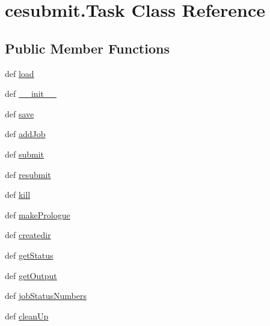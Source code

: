 \section{cesubmit.\-Task Class Reference}
\label{classcesubmit_1_1Task}
\subsection*{Public Member Functions}
\begin{DoxyCompactItemize}
\item 
def \hyperlink{classcesubmit_1_1Task_aee6831424f4d7fd659c6a6b639efd238}{load}
\item 
def \hyperlink{classcesubmit_1_1Task_aff828e186b899e217ee4f60987576e59}{\-\_\-\-\_\-init\-\_\-\-\_\-}
\item 
def \hyperlink{classcesubmit_1_1Task_a01bdfde6cc1a23bcd363717fdd0cbb6e}{save}
\item 
def \hyperlink{classcesubmit_1_1Task_af83f9793281dcbd6e6ab011e3fd6c465}{add\-Job}
\item 
def \hyperlink{classcesubmit_1_1Task_a50c5a9efd1974e36b65ce326eb171e31}{submit}
\item 
def \hyperlink{classcesubmit_1_1Task_affb177e2f520b7ffd8ff19fa179f9f03}{resubmit}
\item 
def \hyperlink{classcesubmit_1_1Task_ad5c7602dc51072e015ea4b1dd97cf90b}{kill}
\item 
def \hyperlink{classcesubmit_1_1Task_a010c41f086e8fa7b616a8d2adfb2a72b}{make\-Prologue}
\item 
def \hyperlink{classcesubmit_1_1Task_a0fa513308849221894249562aa0c6be4}{createdir}
\item 
def \hyperlink{classcesubmit_1_1Task_abbb49773518082b0c314107191470eb2}{get\-Status}
\item 
def \hyperlink{classcesubmit_1_1Task_a2730e4477f76eace94644b3e54e85b14}{get\-Output}
\item 
def \hyperlink{classcesubmit_1_1Task_ab453b2d52e3ad6bb231e5a5bcf1f017a}{job\-Status\-Numbers}
\item 
def \hyperlink{classcesubmit_1_1Task_a3a7d1994bc5941930ac6981a55423ef5}{clean\-Up}
\end{DoxyCompactItemize}
